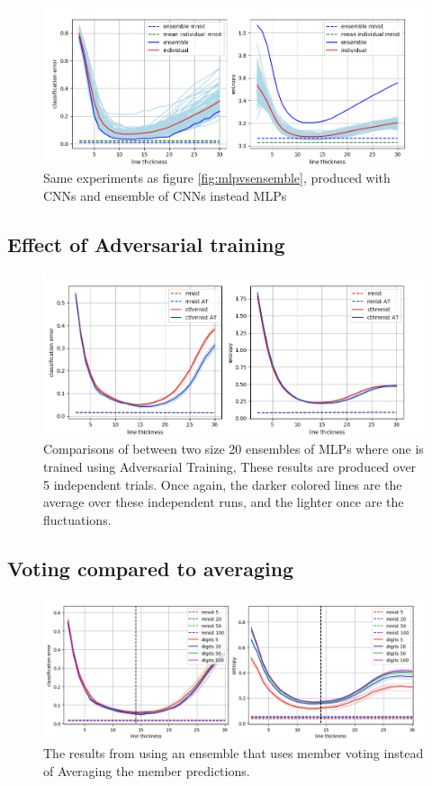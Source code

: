 \begin{figure}
    \centering
    \includegraphics[scale=0.6]{figure/CNNEnsembleVsIndividual.png}
    \caption{Same experiments as figure \ref{fig:mlpvsensemble}, produced with CNNs and ensemble of CNNs instead MLPs}
    \label{fig:CNNvsensemble}
\end{figure}

\subsection{Effect of Adversarial training}
\begin{figure}
    \centering
    \includegraphics[scale=0.6]{figure/ATvsNoAT.png}
    \caption{Comparisons of between two size 20 ensembles of MLPs where one is trained using Adversarial Training, These results are produced over 5 independent trials. Once again, the darker colored lines are the average over these independent runs, and the lighter once are the fluctuations.}
    \label{fig:AT}
\end{figure}

\subsection{Voting compared to averaging}
\begin{figure}
    \centering
    \includegraphics[scale=0.5]{figure/ensembleVote.png}
    \caption{The results from using an ensemble that uses member voting instead of Averaging the member predictions.}
    \label{fig:vote}
\end{figure}


